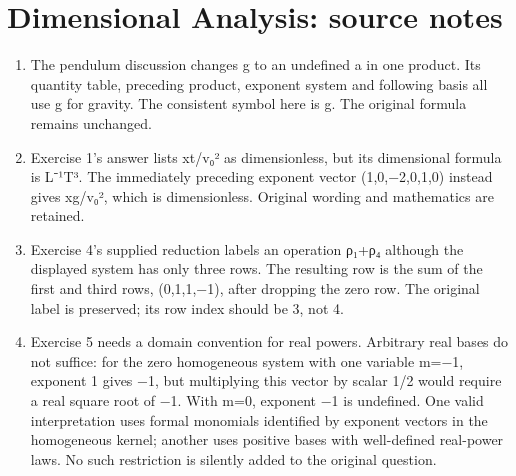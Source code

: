 \section*{Dimensional Analysis: source notes}
\begin{enumerate}
\item The pendulum discussion changes g to an undefined a in one product. Its quantity table, preceding product, exponent system and following basis all use g for gravity. The consistent symbol here is g. The original formula remains unchanged.
\item Exercise 1’s answer lists xt/v₀² as dimensionless, but its dimensional formula is L⁻¹T³. The immediately preceding exponent vector (1,0,−2,0,1,0) instead gives xg/v₀², which is dimensionless. Original wording and mathematics are retained.
\item Exercise 4’s supplied reduction labels an operation ρ₁+ρ₄ although the displayed system has only three rows. The resulting row is the sum of the first and third rows, (0,1,1,−1), after dropping the zero row. The original label is preserved; its row index should be 3, not 4.
\item Exercise 5 needs a domain convention for real powers. Arbitrary real bases do not suffice: for the zero homogeneous system with one variable m=−1, exponent 1 gives −1, but multiplying this vector by scalar 1/2 would require a real square root of −1. With m=0, exponent −1 is undefined. One valid interpretation uses formal monomials identified by exponent vectors in the homogeneous kernel; another uses positive bases with well-defined real-power laws. No such restriction is silently added to the original question.
\end{enumerate}
